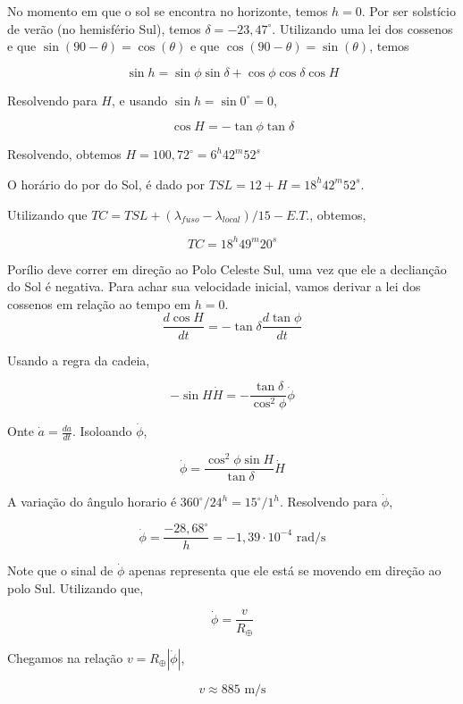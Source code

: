 \documentclass[11pt]{article}
\begin{document}
\begin{pproblem}
\begin{pssolution*}{}{}
\begin{alternativas}
        No momento em que o sol se encontra no horizonte, temos \(h=0\). Por ser solstício de verão (no hemisfério Sul), temos \(\delta = -23,47^\circ\). Utilizando uma lei dos cossenos e que \(\sin(90-\theta) = \cos(\theta)\) e que \(\cos(90-\theta) = \sin(\theta)\), temos 

        \[\sin h = \sin\phi\sin\delta +\cos\phi\cos\delta\cos H\]

        Resolvendo para \(H\), e usando \(\sin h = \sin 0^\circ = 0\), 

        \[\cos H = -\tan\phi\tan\delta\]

        Resolvendo, obtemos \(H = 100,72^\circ = 6^h42^m52^s\)

        O horário do por do Sol, é dado por \(TSL = 12+H = 18^h42^m52^s\).

        Utilizando que \(TC = TSL + (\lambda_{fuso}-\lambda_{local})/15 - E.T.\), obtemos, 

        \[\boxed{TC = 18^h49^m20^s}\]

        \item Porílio deve correr em direção ao Polo Celeste Sul, uma vez que ele a declianção do Sol é negativa. Para achar sua velocidade inicial, vamos derivar a lei dos cossenos em relação ao tempo em \(h=0\).
        \[\frac{d\cos H}{dt} = -\tan\delta \frac{d\tan\phi}{dt}\]

        Usando a regra da cadeia, 

        \[-\sin H \dot{H} = -\frac{\tan\delta}{\cos^2\phi}\dot{\phi}\]

        Onte \(\dot{a} = \frac{da}{dt}\). Isoloando \(\dot{\phi}\), 

        \[\dot{\phi} = \frac{\cos^2\phi\sin H}{\tan\delta}\dot{H}\]

        A variação do ângulo horario é \(360^\circ/24^h = 15^\circ/1^h\). Resolvendo para \(\dot{\phi}\), 

        \[\dot{\phi} = \frac{-28,68^\circ}{h} = -1,39\cdot 10^{-4}\text{ rad/s}\]

        Note que o sinal de \(\dot{\phi}\) apenas representa que ele está se movendo em direção ao polo Sul. Utilizando que, 

        \[\dot{\phi} = \frac{v}{R_\oplus}\]

        Chegamos na relação \(v = R_\oplus|\dot{\phi}|\),
        
        \[\boxed{v \approx 885 \text{ m/s}}\]


\end{alternativas}
\end{pssolution*}
\end{pproblem}
\end{document}
